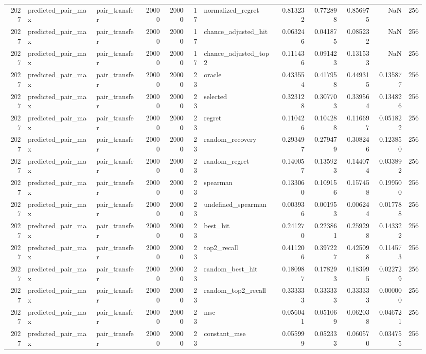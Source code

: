 \begin{tabular}{rllrrrlrrrrr}
2027 & predicted_pair_max & pair_transfer & 20000 & 20000 & 17 & normalized_regret & 0.813232 & 0.772898 & 0.856975 & NaN & 256 \\
2027 & predicted_pair_max & pair_transfer & 20000 & 20000 & 17 & chance_adjusted_hit & 0.063246 & 0.041875 & 0.085232 & NaN & 256 \\
2027 & predicted_pair_max & pair_transfer & 20000 & 20000 & 17 & chance_adjusted_top2 & 0.111436 & 0.091423 & 0.131533 & NaN & 256 \\
2027 & predicted_pair_max & pair_transfer & 20000 & 20000 & 23 & oracle & 0.433554 & 0.417958 & 0.449315 & 0.135877 & 256 \\
2027 & predicted_pair_max & pair_transfer & 20000 & 20000 & 23 & selected & 0.323128 & 0.307703 & 0.339564 & 0.134826 & 256 \\
2027 & predicted_pair_max & pair_transfer & 20000 & 20000 & 23 & regret & 0.110426 & 0.104288 & 0.116697 & 0.051822 & 256 \\
2027 & predicted_pair_max & pair_transfer & 20000 & 20000 & 23 & random_recovery & 0.293497 & 0.279479 & 0.308246 & 0.123850 & 256 \\
2027 & predicted_pair_max & pair_transfer & 20000 & 20000 & 23 & random_regret & 0.140057 & 0.135923 & 0.144074 & 0.033892 & 256 \\
2027 & predicted_pair_max & pair_transfer & 20000 & 20000 & 23 & spearman & 0.133060 & 0.109156 & 0.157458 & 0.199500 & 256 \\
2027 & predicted_pair_max & pair_transfer & 20000 & 20000 & 23 & undefined_spearman & 0.003936 & 0.001953 & 0.006244 & 0.017788 & 256 \\
2027 & predicted_pair_max & pair_transfer & 20000 & 20000 & 23 & best_hit & 0.241270 & 0.223861 & 0.259298 & 0.143322 & 256 \\
2027 & predicted_pair_max & pair_transfer & 20000 & 20000 & 23 & top2_recall & 0.411206 & 0.397227 & 0.425098 & 0.114573 & 256 \\
2027 & predicted_pair_max & pair_transfer & 20000 & 20000 & 23 & random_best_hit & 0.180987 & 0.178293 & 0.183995 & 0.022729 & 256 \\
2027 & predicted_pair_max & pair_transfer & 20000 & 20000 & 23 & random_top2_recall & 0.333333 & 0.333333 & 0.333333 & 0.000000 & 256 \\
2027 & predicted_pair_max & pair_transfer & 20000 & 20000 & 23 & mse & 0.056041 & 0.051069 & 0.062038 & 0.046721 & 256 \\
2027 & predicted_pair_max & pair_transfer & 20000 & 20000 & 23 & constant_mse & 0.055999 & 0.052333 & 0.060570 & 0.034755 & 256 \\

\end{tabular}
